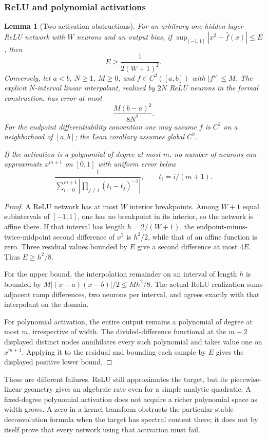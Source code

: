 \documentclass[11pt,letterpaper]{article}
\newtheorem{lemma}{Lemma}[section]
\theoremstyle{definition}
\theoremstyle{remark}
\begin{document}
\subsubsection{ReLU and polynomial activations}
\begin{lemma}[Two activation obstructions]\label{thm:obstructions}
For an arbitrary one-hidden-layer ReLU network with \(W\) neurons and an output
bias, if
\(\sup_{[-1,1]}|x^2-\widehat f(x)|\le E\), then
\[
 E\ge\frac{1}{2(W+1)^2}.
\]
Conversely, let \(a<b\), \(N\ge1\), \(M\ge0\), and
\(f\in C^2([a,b])\) with \(|f''|\le M\). The explicit
\(N\)-interval linear interpolant, realized by \(2N\) ReLU neurons in the
formal construction, has error at most
\[
 \frac{M(b-a)^2}{8N^2}.
\]
For the endpoint differentiability convention one may assume \(f\) is \(C^2\)
on a neighborhood of \([a,b]\); the Lean corollary assumes global \(C^2\).

If the activation is a polynomial of degree at most \(m\), no number of neurons
can approximate \(x^{m+1}\) on \([0,1]\) with uniform error below
\[
 \frac1{\displaystyle\sum_{i=0}^{m+1}
         \left|\prod_{j\ne i}(t_i-t_j)^{-1}\right|},
 \qquad t_i=i/(m+1).
\]
\end{lemma}
\begin{proof}
A ReLU network has at most \(W\) interior breakpoints. Among \(W+1\)
equal subintervals of \([-1,1]\), one has no breakpoint in its interior, so
the network is affine there. If that interval has length \(h=2/(W+1)\),
the endpoint-minus-twice-midpoint second difference of \(x^2\) is \(h^2/2\),
while that of an affine function is zero.
Three residual values bounded by \(E\) give a second difference at most \(4E\).
Thus \(E\ge h^2/8\).

For the upper bound, the interpolation remainder on an interval of length
\(h\) is bounded by \(M|(x-a)(x-b)|/2\le Mh^2/8\).
The actual ReLU realization sums adjacent ramp differences, two neurons per
interval, and agrees exactly with that interpolant on the domain.

For polynomial activation, the entire output remains a polynomial of degree
at most \(m\), irrespective of width. The divided-difference functional at
the \(m+2\) displayed distinct nodes annihilates every such polynomial and
takes value one on \(x^{m+1}\). Applying it to the residual and bounding each
sample by \(E\) gives the displayed positive lower bound.
\end{proof}

These are different failures. ReLU still approximates the target, but its
piecewise-linear geometry gives an algebraic rate even for a simple analytic
quadratic. A fixed-degree polynomial activation does not acquire a richer
polynomial space as width grows. A zero in a kernel transform obstructs the
particular stable deconvolution formula when the target has spectral content
there; it does not by itself prove that every network using that activation
must fail.
\end{document}
